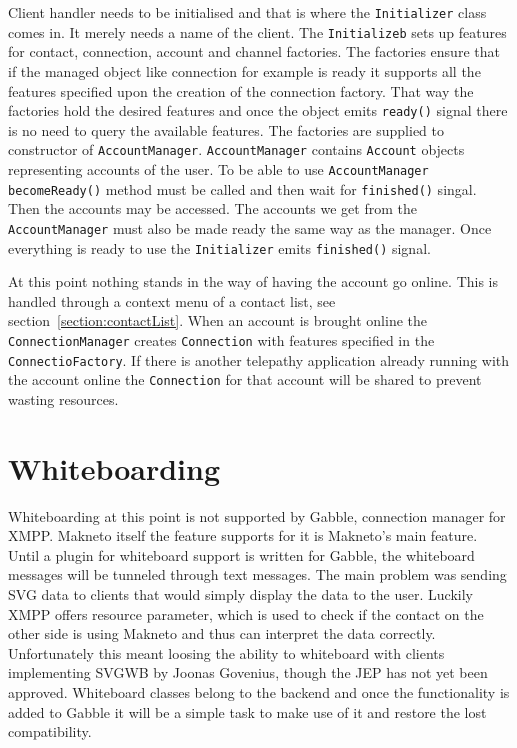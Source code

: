 Client handler needs to be initialised and that is where the \verb|Initializer| class comes in. It merely needs a name of the client. The \verb|Initializeb| sets up features for contact, connection, account and channel factories. The factories ensure that if the managed object like connection for example is ready it supports all the features specified upon the creation of the connection factory. That way the factories hold the desired features and once the object emits \verb|ready()| signal there is no need to query the available features. The factories are supplied to constructor of \verb|AccountManager|. \verb|AccountManager| contains \verb|Account| objects representing accounts of the user. To be able to use \verb|AccountManager| \verb|becomeReady()| method must be called and then wait for \verb|finished()| singal. Then the accounts may be accessed. The accounts we get from the \verb|AccountManager| must also be made ready the same way as the manager. Once everything is ready to use the \verb|Initializer| emits \verb|finished()| signal. 

At this point nothing stands in the way of having the account go online. This is handled through a context menu of a contact list, see section~\ref{section:contactList}. When an account is brought online the \verb|ConnectionManager| creates \verb|Connection| with features specified in the \verb|ConnectioFactory|. If there is another telepathy application already running with the account online the \verb|Connection| for that account will be shared to prevent wasting resources. 


\section{Whiteboarding}
Whiteboarding at this point is not supported by Gabble, connection manager for XMPP. Makneto itself the feature supports for it is Makneto's main feature. Until a plugin for whiteboard support is written for Gabble, the whiteboard messages will be tunneled through text messages. The main problem was sending SVG data to clients that would simply display the data to the user. Luckily XMPP offers resource parameter, which is used to check if the contact on the other side is using Makneto and thus can interpret the data correctly. Unfortunately this meant loosing the ability to whiteboard with clients implementing SVGWB by Joonas Govenius, though the JEP has not yet been approved. Whiteboard classes belong to the backend and once the functionality is added to Gabble it will be a simple task to make use of it and restore the lost compatibility. 

